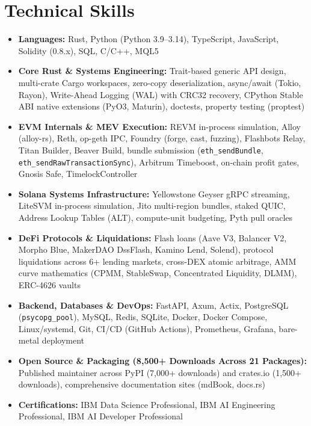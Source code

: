 \documentclass[10pt,a4paper]{article}
\begin{document}
\section{Technical Skills}
\begin{itemize}
    \item \textbf{Languages:} Rust, Python (Python 3.9--3.14), TypeScript, JavaScript, Solidity (0.8.x), SQL, C/C++, MQL5
    \item \textbf{Core Rust \& Systems Engineering:} Trait-based generic API design, multi-crate Cargo workspaces, zero-copy deserialization, async/await (Tokio, Rayon), Write-Ahead Logging (WAL) with CRC32 recovery, CPython Stable ABI native extensions (PyO3, Maturin), doctests, property testing (proptest)
    \item \textbf{EVM Internals \& MEV Execution:} REVM in-process simulation, Alloy (alloy-rs), Reth, op-geth IPC, Foundry (forge, cast, fuzzing), Flashbots Relay, Titan Builder, Beaver Build, bundle submission (\texttt{eth\_sendBundle}, \texttt{eth\_sendRawTransactionSync}), Arbitrum Timeboost, on-chain profit gates, Gnosis Safe, TimelockController
    \item \textbf{Solana Systems Infrastructure:} Yellowstone Geyser gRPC streaming, LiteSVM in-process simulation, Jito multi-region bundles, staked QUIC, Address Lookup Tables (ALT), compute-unit budgeting, Pyth pull oracles
    \item \textbf{DeFi Protocols \& Liquidations:} Flash loans (Aave V3, Balancer V2, Morpho Blue, MakerDAO DssFlash, Kamino Lend, Solend), protocol liquidations across 6+ lending markets, cross-DEX atomic arbitrage, AMM curve mathematics (CPMM, StableSwap, Concentrated Liquidity, DLMM), ERC-4626 vaults
    \item \textbf{Backend, Databases \& DevOps:} FastAPI, Axum, Actix, PostgreSQL (\texttt{psycopg\_pool}), MySQL, Redis, SQLite, Docker, Docker Compose, Linux/systemd, Git, CI/CD (GitHub Actions), Prometheus, Grafana, bare-metal deployment
    \item \textbf{Open Source \& Packaging (8,500+ Downloads Across 21 Packages):} Published maintainer across PyPI (7,000+ downloads) and crates.io (1,500+ downloads), comprehensive documentation sites (mdBook, docs.rs)
    \item \textbf{Certifications:} IBM Data Science Professional, IBM AI Engineering Professional, IBM AI Developer Professional
\end{itemize}

\end{document}

